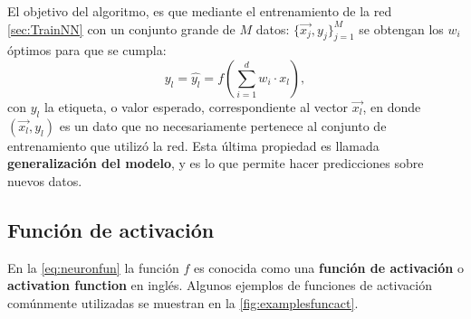 El objetivo del algoritmo, es que mediante el entrenamiento de la red \autoref{sec:TrainNN} con un conjunto grande de $M$ datos: $\{\vec{x_j},y_j\}_{j=1}^{M}$ se obtengan los $w_i$ óptimos para que se cumpla:
$$y_l= \hat{y_l} = f\left( \sum_{i=1}^dw_i\cdot x_l \right),$$
con $y_l$ la etiqueta, o valor esperado, correspondiente al vector $\vec{x_l}$, en donde $(\vec{x_l},y_l)$ es un dato que no necesariamente pertenece al conjunto de entrenamiento que utilizó la red. Esta última propiedad es llamada \textbf{generalización del modelo}, y es lo que permite hacer predicciones sobre nuevos datos.

\subsection{Función de activación}\label{sec:FuncAct}

En la \autoref{eq:neuronfun} la función $f$ es conocida como una \textbf{función de activación} \cite{nwankpa2018} o \textbf{activation function} en inglés. Algunos ejemplos de funciones de activación comúnmente utilizadas se muestran en la \autoref{fig:examplesfuncact}. 

